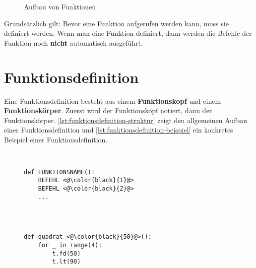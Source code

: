 \begin{figure}[htb]
\centering
{}
\caption{Aufbau von Funktionen}
\label{figure-funktionen-aufbau}
\end{figure}

\begin{important}
Grundsätzlich gilt: Bevor eine Funktion aufgerufen werden kann, muss sie definiert werden. Wenn man eine Funktion definiert, dann werden die Befehle der Funktion noch \textbf{nicht} automatisch ausgeführt.
\end{important}

\section{Funktionsdefinition}

Eine Funktionsdefinition besteht aus einem \textbf{Funktionskopf} und einem \textbf{Funktionskörper}. Zuerst wird der Funktionskopf notiert, dann der Funktionskörper. \autoref{lst:funktionsdefinition-struktur} zeigt den allgemeinen Aufbau einer Funktionsdefinition und \autoref{lst:funktionsdefinition-beispiel} ein konkretes Beispiel einer Funktionsdefinition.

\begin{figure}[H]
\centering
\begin{minipage}{0.4\textwidth}
\begin{lstlisting}[language={python3}, caption={Allgemeine Struktur}, label={lst:funktionsdefinition-struktur}]


def FUNKTIONSNAME():
	BEFEHL <@\color{black}{1}@>
	BEFEHL <@\color{black}{2}@>
	...


\end{lstlisting}
\end{minipage}
\hfill
\begin{minipage}{0.55\textwidth}
\centering
\begin{lstlisting}[language={python3}, caption={Beispiel einer Funktionsdefinition}, label={lst:funktionsdefinition-beispiel}]


def quadrat_<@\color{black}{50}@>():
	for _ in range(4):
		t.fd(50)
		t.lt(90)


\end{lstlisting}
\end{minipage}
\end{figure}


